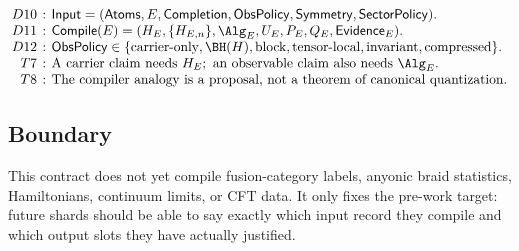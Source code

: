 {\small
\[
\setlength{\arraycolsep}{2pt}
\begin{array}{rcl}
D10 &:& \mathsf{Input}=(\mathsf{Atoms},E,\mathsf{Completion},\mathsf{ObsPolicy},
        \mathsf{Symmetry},\mathsf{SectorPolicy}).\\
D11 &:& \mathsf{Compile}(E)=(H_E,\{H_{E,n}\},\Alg_E,U_E,P_E,Q_E,
        \mathsf{Evidence}_E).\\
D12 &:& \mathsf{ObsPolicy}\in\{\text{carrier-only},\BH(H),\text{block},
        \text{tensor-local},\text{invariant},\text{compressed}\}.\\
T7 &:& \text{A carrier claim needs }H_E;\ \text{an observable claim also needs }\Alg_E.\\
T8 &:& \text{The compiler analogy is a proposal, not a theorem of canonical quantization.}
\end{array}
\]
}

\subsection{Boundary}

This contract does not yet compile fusion-category labels, anyonic braid
statistics, Hamiltonians, continuum limits, or CFT data.  It only fixes the
pre-work target: future shards should be able to say exactly which input record
they compile and which output slots they have actually justified.
